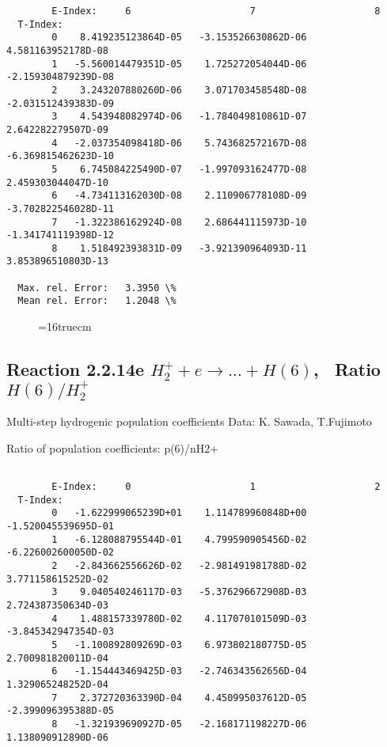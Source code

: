 \documentclass[12pt,dvipdfmx]{article}
\begin{document}
{\begin{small}
\begin{verbatim}
        E-Index:     6                     7                     8
  T-Index:
        0    8.419235123864D-05   -3.153526630862D-06    4.581163952178D-08
        1   -5.560014479351D-05    1.725272054044D-06   -2.159304879239D-08
        2    3.243207880260D-06    3.071703458548D-08   -2.031512439383D-09
        3    4.543948082974D-06   -1.784049810861D-07    2.642282279507D-09
        4   -2.037354098418D-06    5.743682572167D-08   -6.369815462623D-10
        5    6.745084225490D-07   -1.997093162477D-08    2.459303044047D-10
        6   -4.734113162030D-08    2.110906778108D-09   -3.702822546028D-11
        7   -1.322386162924D-08    2.686441115973D-10   -1.341741119398D-12
        8    1.518492393831D-09   -3.921390964093D-11    3.853896510803D-13

  Max. rel. Error:   3.3950 \%
  Mean rel. Error:   1.2048 \%

\end{verbatim}\end{small}
\begin{figure} \label{2.2.14d}
\epsfxsize=16truecm
\end{figure}
\newpage


\subsection{
Reaction 2.2.14e $ H_2^+ + e \rightarrow ...+ H(6) $, \   Ratio $H(6)/H_2^+  $
}

 Multi-step hydrogenic population coefficients
 Data: K. Sawada, T.Fujimoto \cite{kn:Sawada}

 Ratio of population coefficients: p(6)/nH2+

\begin{small}\begin{verbatim}

        E-Index:     0                     1                     2
  T-Index:
        0   -1.622999065239D+01    1.114789960848D+00   -1.520045539695D-01
        1   -6.128088795544D-01    4.799590905456D-02   -6.226002600050D-02
        2   -2.843662556626D-02   -2.981491981788D-02    3.771158615252D-02
        3    9.040540246117D-03   -5.376296672908D-03    2.724387350634D-03
        4    1.488157339780D-02    4.117070101509D-03   -3.845342947354D-03
        5   -1.100892809269D-03    6.973802180775D-05    2.700981820011D-04
        6   -1.154443469425D-03   -2.746343562656D-04    1.329065248252D-04
        7    2.372720363390D-04    4.450995037612D-05   -2.399096395388D-05
        8   -1.321939690927D-05   -2.168171198227D-06    1.138090912890D-06


\end{verbatim}
\end{small}}
\end{document}
